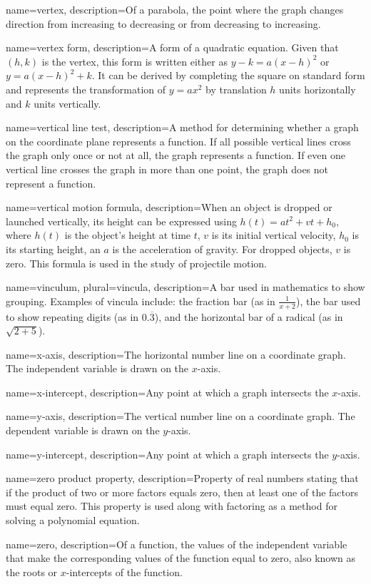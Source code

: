  {
	name=vertex,
	description={Of a parabola, the point where the graph changes direction from increasing to decreasing or from decreasing to increasing.}
}

 {
	name=vertex form,
	description={A form of a quadratic equation. Given that $(h,k)$ is the vertex, this form is written either as $y-k = a(x-h)^2$ or $y=a(x-h)^2+k$. It can be derived by completing the square on standard form and represents the transformation of $y = ax^2$ by translation $h$ units horizontally and $k$ units vertically.}
}

 {
	name=vertical line test,
	description={A method for determining whether a graph on the coordinate plane represents a function. If all possible vertical lines cross the graph only once or not at all, the graph represents a function. If even one vertical line crosses the graph in more than one point, the graph does not represent a function.}
}

 {
	name=vertical motion formula,
	description={When an object is dropped or launched vertically, its height can be expressed using $h(t) = at^2 + vt + h_0$, where $h(t)$ is the object's height at time $t$, $v$ is its initial vertical velocity, $h_0$ is its starting height, an $a$ is the acceleration of gravity. For dropped objects, $v$ is zero. This formula is used in the study of projectile motion.}
}

 {
	name=vinculum,
	plural=vincula,
	description={A bar used in mathematics to show grouping. Examples of vincula include: the fraction bar (as in $\frac{1}{x+2}$), the bar used to show repeating digits (as in $0.\overline{3}$), and the horizontal bar of a radical (as in $\sqrt{2+5}$).}
}

 {
	name=x-axis,
	description={The horizontal number line on a coordinate graph. The independent variable is drawn on the $x$-axis.}
}

 {
	name=x-intercept,
	description={Any point at which a graph intersects the $x$-axis.}
}

 {
	name=y-axis,
	description={The vertical number line on a coordinate graph. The dependent variable is drawn on the $y$-axis.}
}

 {
	name=y-intercept,
	description={Any point at which a graph intersects the $y$-axis.}
}

 {
	name=zero product property,
	description={Property of real numbers stating that if the product of two or more factors equals zero, then at least one of the factors must equal zero. This property is used along with factoring as a method for solving a polynomial equation.}
}

 {
	name=zero,
	description={Of a function, the values of the independent variable that make the corresponding values of the function equal to zero, also known as the \glspl{root} or $x$-intercepts of the function.}
}
